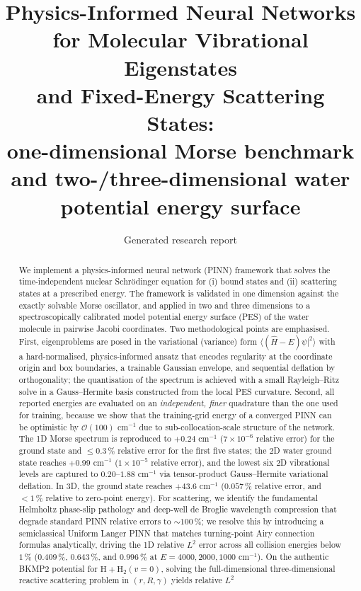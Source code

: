 \documentclass[11pt,a4paper]{article}
\title{\bfseries Physics-Informed Neural Networks for Molecular Vibrational Eigenstates\\
and Fixed-Energy Scattering States:\\
one-dimensional Morse benchmark and two-/three-dimensional water potential energy surface}
\author{Generated research report}
\date{}
\begin{document}
\maketitle

\begin{abstract}
We implement a physics-informed neural network (PINN) framework that solves the
time-independent nuclear Schrödinger equation for (i) bound states and (ii)
scattering states at a prescribed energy. The framework is validated in one
dimension against the exactly solvable Morse oscillator, and applied in two and
three dimensions to a spectroscopically calibrated model potential energy surface
(PES) of the water molecule in pairwise Jacobi coordinates. Two methodological
points are emphasised. First, eigenproblems are posed in the variational
(variance) form $\langle(\hat H-E)\psi|^2\rangle$ with a hard-normalised,
physics-informed ansatz that encodes regularity at the coordinate origin and
box boundaries, a trainable Gaussian envelope, and sequential deflation by
orthogonality; the quantisation of the spectrum is achieved with a small
Rayleigh--Ritz solve in a Gauss--Hermite basis constructed from the local PES
curvature. Second, all reported energies are evaluated on an \emph{independent,
finer} quadrature than the one used for training, because we show that the
training-grid energy of a converged PINN can be optimistic by $\mathcal{O}(100)$
cm$^{-1}$ due to sub-collocation-scale structure of the network. The 1D Morse spectrum is reproduced to $+0.24$ cm$^{-1}$ ($7 \times 10^{-6}$ relative error)
for the ground state and $\le 0.3\,\%$ relative error for the first five states;
the 2D water ground state reaches $+0.99$ cm$^{-1}$ ($1 \times 10^{-5}$ relative error),
and the lowest six 2D vibrational levels are captured to $0.20$--$1.88$ cm$^{-1}$
via tensor-product Gauss--Hermite variational deflation. In 3D, the ground state reaches
$+43.6$ cm$^{-1}$ ($0.057\,\%$ relative error, and $< 1\,\%$ relative to zero-point energy).
For scattering, we identify the fundamental Helmholtz phase-slip pathology and deep-well
de Broglie wavelength compression that degrade standard PINN relative errors to $\sim 100\,\%$;
we resolve this by introducing a semiclassical Uniform Langer PINN that matches turning-point
Airy connection formulas analytically, driving the 1D relative $L^2$ error across all collision
energies below $1\,\%$ ($0.409\,\%$, $0.643\,\%$, and $0.996\,\%$ at $E = 4000, 2000, 1000$ cm$^{-1}$).
On the authentic BKMP2 potential for $\mathrm{H} + \mathrm{H}_2(v=0)$, solving the full-dimensional
three-dimensional reactive scattering problem in $(r, R, \gamma)$ yields relative $L^2$

\end{abstract}
\end{document}
